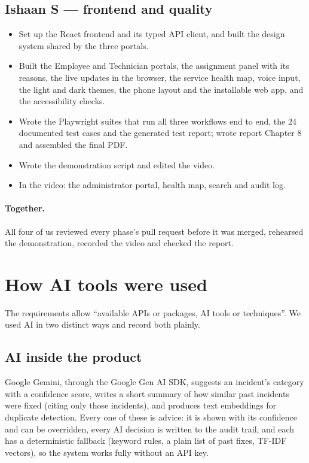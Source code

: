 \subsection*{Ishaan S --- frontend and quality}
\begin{itemize}
  \item Set up the React frontend and its typed API client, and built the design system shared
    by the three portals.
  \item Built the Employee and Technician portals, the assignment panel with its reasons, the
    live updates in the browser, the service health map, voice input, the light and dark
    themes, the phone layout and the installable web app, and the accessibility checks.
  \item Wrote the Playwright suites that run all three workflows end to end, the 24 documented
    test cases and the generated test report; wrote report Chapter 8 and assembled the final PDF.
  \item Wrote the demonstration script and edited the video.
  \item In the video: the administrator portal, health map, search and audit log.
\end{itemize}

\paragraph{Together.} All four of us reviewed every phase's pull request before it was merged,
rehearsed the demonstration, recorded the video and checked the report.

\section{How AI tools were used}
The requirements allow ``available APIs or packages, AI tools or techniques''. We used AI in two
distinct ways and record both plainly.

\subsection*{AI inside the product}
Google Gemini, through the Google Gen AI SDK, suggests an incident's category with a confidence
score, writes a short summary of how similar past incidents were fixed (citing only those
incidents), and produces text embeddings for duplicate detection. Every one of these is advice:
it is shown with its confidence and can be overridden, every AI decision is written to the
audit trail, and each has a deterministic fallback (keyword rules, a plain list of past fixes,
TF-IDF vectors), so the system works fully without an API key.

